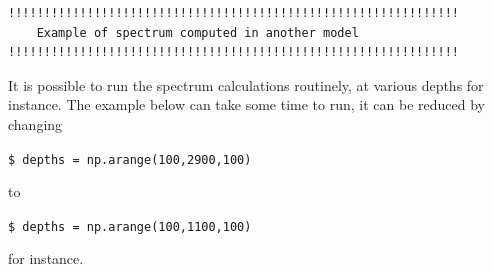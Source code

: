 \documentclass[12pt]{article}
\begin{document}
    \begin{Verbatim}[commandchars=\\\{\},fontsize=\footnotesize]
!!!!!!!!!!!!!!!!!!!!!!!!!!!!!!!!!!!!!!!!!!!!!!!!!!!!!!!!!!!!!!!
    Example of spectrum computed in another model 
!!!!!!!!!!!!!!!!!!!!!!!!!!!!!!!!!!!!!!!!!!!!!!!!!!!!!!!!!!!!!!!
    \end{Verbatim}

    \begin{center}
    \end{center}
It is possible to run the spectrum calculations routinely, at
various depths for instance. The example below can take some
time to run, it can be reduced by changing

\verb?$ depths = np.arange(100,2900,100)?

to

\verb?$ depths = np.arange(100,1100,100)?

\noindent  for instance.
\end{document}
